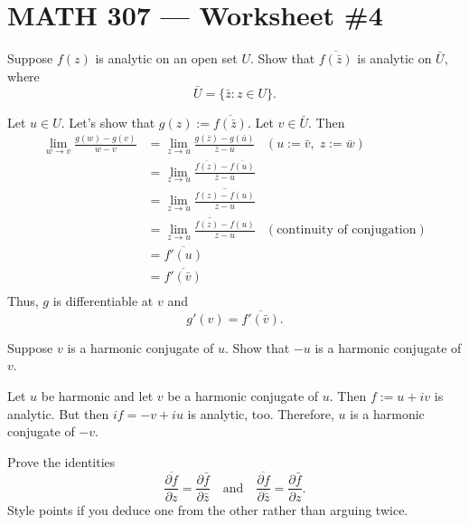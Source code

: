 \documentclass[12pt]{exam}
\begin{document}
\section*{MATH 307 --- Worksheet \#4 }

\begin{questions}
    \setlength\itemsep{0.5em}
    \setlength\parskip{0.5em}

    
    \question
    Suppose $f(z)$ is analytic on an open set $U$. Show that $\overline{f(\bar z)}$ is analytic on $\bar U$,
    where
    \[
        \bar U = \{\bar z: z\in U\}.
    \]

    \begin{solution}
        Let $u\in U$. 
        Let's show that $g(z):=\overline{f(\bar z)}$. Let $v\in \bar U$. Then
        \begin{align*}
            \lim_{w\to  v}\frac{g(w) - g(v)}{w - v}
            &= \lim_{z\to u}\frac{g(\bar z)-g(\bar u)}{\bar z - \bar u}& (u := \bar v,\; z:=\bar w)\\
            &= \lim_{z\to u}\frac{\overline{f(z)}-\overline{f(u)}}{\bar z - \bar u}\\
            &= \lim_{z\to u}\overline{\frac{f(z)-f(u)}{z - u}}\\
            &= \overline{\lim_{z\to u}\frac{f(z)-f(u)}{z - u}}&(\text{continuity of conjugation})\\
            &= \overline{f'(u)}\\
            &= \overline{f'(\bar v)}\\
        \end{align*}
        Thus, $g$ is differentiable at $v$ and
        \[
            g'(v) = \overline{f'(\bar v)}.
        \]
    \end{solution}

    \question
    Suppose $v$ is a harmonic conjugate of $u$. Show that $-u$ is a harmonic conjugate of $v$.

    \begin{solution}

        Let $u$ be harmonic and let $v$ be a harmonic conjugate of $u$. Then $f:= u+iv$ is analytic.
        But then $if = -v + iu$ is analytic, too. Therefore, $u$ is a harmonic conjugate of $-v$.
    \end{solution}

\question
Prove the identities $$\overline{\dfrac{\partial f}{\partial z}} = \dfrac{\partial \bar f}{\partial \bar z}\quad\text{and}\quad
\overline{\dfrac{\partial f}{\partial \bar z}} = \dfrac{\partial \bar f}{\partial z}.$$
Style points if you deduce one from the other rather than arguing twice.


\end{questions}
\end{document}
